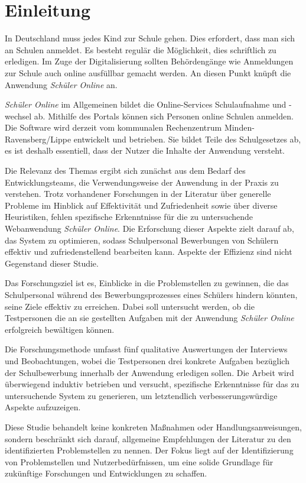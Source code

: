 \section{Einleitung}
In Deutschland muss jedes Kind zur Schule gehen. Dies erfordert, dass man sich an Schulen anmeldet. Es besteht regulär die Möglichkeit, dies schriftlich zu erledigen. Im Zuge der Digitalisierung sollten Behördengänge wie Anmeldungen zur Schule auch online ausfüllbar gemacht werden. An diesen Punkt knüpft die Anwendung \textit{Schüler Online} an.

\textit{Schüler Online} im Allgemeinen bildet die Online-Services Schulaufnahme und -wechsel ab. Mithilfe des Portals können sich Personen online Schulen anmelden. Die Software wird derzeit vom kommunalen Rechenzentrum Minden-Ravensberg/Lippe entwickelt und betrieben. Sie bildet Teile des Schulgesetzes ab, es ist deshalb essentiell, dass der Nutzer die Inhalte der Anwendung versteht. 

Die Relevanz des Themas ergibt sich zunächst aus dem Bedarf des Entwicklungsteams, die Verwendungsweise der Anwendung in der Praxis zu verstehen. Trotz vorhandener Forschungen in der Literatur über generelle Probleme im Hinblick auf Effektivität und Zufriedenheit sowie über diverse Heuristiken, fehlen spezifische Erkenntnisse für die zu untersuchende Webanwendung \textit{Schüler Online}. Die Erforschung dieser Aspekte zielt darauf ab, das System zu optimieren, sodass Schulpersonal Bewerbungen von Schülern effektiv und zufriedenstellend bearbeiten kann. Aspekte der Effizienz sind nicht Gegenstand dieser Studie.

Das Forschungsziel ist es, Einblicke in die Problemstellen zu gewinnen, die das Schulpersonal während des Bewerbungsprozesses eines Schülers hindern könnten, seine Ziele effektiv zu erreichen. Dabei soll untersucht werden, ob die Testpersonen die an sie gestellten Aufgaben mit der Anwendung \textit{Schüler Online} erfolgreich bewältigen können. 

Die Forschungsmethode umfasst fünf qualitative Auswertungen der Interviews und Beobachtungen, wobei die Testpersonen drei konkrete Aufgaben bezüglich der Schulbewerbung innerhalb der Anwendung erledigen sollen. Die Arbeit wird überwiegend induktiv betrieben und versucht, spezifische Erkenntnisse für das zu untersuchende System zu generieren, um letztendlich verbesserungswürdige Aspekte aufzuzeigen.

Diese Studie behandelt keine konkreten Maßnahmen oder Handlungsanweisungen, sondern beschränkt sich darauf, allgemeine Empfehlungen der Literatur zu den identifizierten Problemstellen zu nennen. Der Fokus liegt auf der Identifizierung von Problemstellen und Nutzerbedürfnissen, um eine solide Grundlage für zukünftige Forschungen und Entwicklungen zu schaffen.

